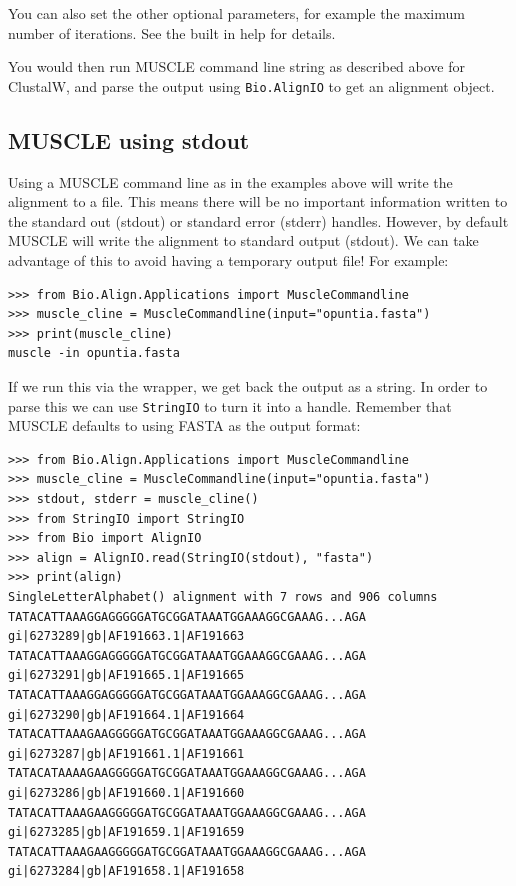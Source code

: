 \documentclass{report}
\begin{document}
You can also set the other optional parameters, for example the maximum number
of iterations. See the built in help for details.

You would then run MUSCLE command line string as described above for
ClustalW, and parse the output using \verb|Bio.AlignIO| to get an
alignment object.

\subsection{MUSCLE using stdout}

Using a MUSCLE command line as in the examples above will write the alignment
to a file. This means there will be no important information written to the
standard out (stdout) or standard error (stderr) handles. However, by default
MUSCLE will write the alignment to standard output (stdout). We can take
advantage of this to avoid having a temporary output file! For example:

\begin{verbatim}
>>> from Bio.Align.Applications import MuscleCommandline
>>> muscle_cline = MuscleCommandline(input="opuntia.fasta")
>>> print(muscle_cline)
muscle -in opuntia.fasta
\end{verbatim}

If we run this via the wrapper, we get back the output as a string. In order
to parse this we can use \verb|StringIO| to turn it into a handle.
Remember that MUSCLE defaults to using FASTA as the output format:

\begin{verbatim}
>>> from Bio.Align.Applications import MuscleCommandline
>>> muscle_cline = MuscleCommandline(input="opuntia.fasta")
>>> stdout, stderr = muscle_cline()
>>> from StringIO import StringIO
>>> from Bio import AlignIO
>>> align = AlignIO.read(StringIO(stdout), "fasta")
>>> print(align)
SingleLetterAlphabet() alignment with 7 rows and 906 columns
TATACATTAAAGGAGGGGGATGCGGATAAATGGAAAGGCGAAAG...AGA gi|6273289|gb|AF191663.1|AF191663
TATACATTAAAGGAGGGGGATGCGGATAAATGGAAAGGCGAAAG...AGA gi|6273291|gb|AF191665.1|AF191665
TATACATTAAAGGAGGGGGATGCGGATAAATGGAAAGGCGAAAG...AGA gi|6273290|gb|AF191664.1|AF191664
TATACATTAAAGAAGGGGGATGCGGATAAATGGAAAGGCGAAAG...AGA gi|6273287|gb|AF191661.1|AF191661
TATACATAAAAGAAGGGGGATGCGGATAAATGGAAAGGCGAAAG...AGA gi|6273286|gb|AF191660.1|AF191660
TATACATTAAAGAAGGGGGATGCGGATAAATGGAAAGGCGAAAG...AGA gi|6273285|gb|AF191659.1|AF191659
TATACATTAAAGAAGGGGGATGCGGATAAATGGAAAGGCGAAAG...AGA gi|6273284|gb|AF191658.1|AF191658
\end{verbatim}
\end{document}
